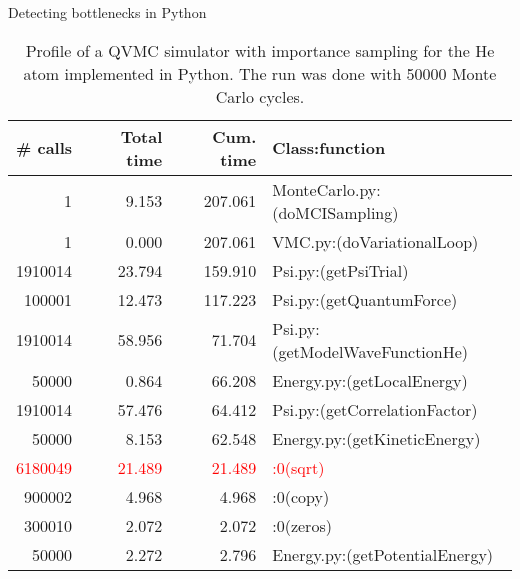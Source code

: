 \begin{frame}{Detecting bottlenecks in Python}
  \begin{scriptsize}
    \begin{table}
      \centering
      \begin{tabular}{rrrl}
        \toprule[1pt]
        \textbf{\# calls} & \textbf{Total time} & \textbf{Cum. time} & \textbf{Class:function}\\
        \midrule[1pt]
        \scriptsize
              1  &  9.153 &   207.061  & \footnotesize{MonteCarlo.py:(doMCISampling)}\\
              1  &  0.000 &   207.061  & \footnotesize{VMC.py:(doVariationalLoop)}\\
        1910014  & 23.794 &   159.910  & \footnotesize{Psi.py:(getPsiTrial)}\\
          100001 & 12.473 &   117.223  & \footnotesize{Psi.py:(getQuantumForce)}\\
        1910014  & 58.956 &   71.704   & \footnotesize{Psi.py:(getModelWaveFunctionHe)}\\
          50000  &  0.864 &  66.208    & \footnotesize{Energy.py:(getLocalEnergy)}\\
        1910014  & 57.476 &   64.412   & \footnotesize{Psi.py:(getCorrelationFactor)}\\
          50000  &  8.153 &  62.548    & \footnotesize{Energy.py:(getKineticEnergy)}\\
        \textcolor{red}{6180049}  &  \textcolor{red}{21.489} & \textcolor{red}{21.489}    & \textcolor{red}{\footnotesize{:0(sqrt)}}\\
          900002  &  4.968 &  4.968    & \footnotesize{:0(copy)}\\
          300010  &  2.072 &  2.072    & \footnotesize{:0(zeros)}\\
          50000  &  2.272  &  2.796    & \footnotesize{Energy.py:(getPotentialEnergy)}\\
        \bottomrule[1pt]
      \end{tabular}\caption{\scriptsize Profile of a QVMC simulator with importance sampling for the He atom implemented in Python. The run was done with 50000 Monte Carlo cycles.}
      \label{profileHe}
    \end{table}
  \end{scriptsize}
\end{frame}




